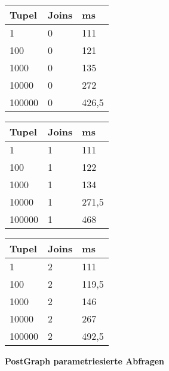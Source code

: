 \begin{table}[H]
\centering
\begin{subtable}[t]{0.3\textwidth}
\centering
\begin{tabular}{|l|l|l|}
\hline
Tupel  & Joins & ms    \\ \hline
1      & 0     & 111   \\ \hline
100    & 0     & 121   \\ \hline
1000   & 0     & 135   \\ \hline
10000  & 0     & 272   \\ \hline
100000 & 0     & 426,5 \\ \hline
\end{tabular}
\end{subtable}%
\hfill
\begin{subtable}[t]{0.3\textwidth}
\centering
\begin{tabular}{|l|l|l|}
\hline
Tupel  & Joins & ms    \\ \hline
1      & 1     & 111   \\ \hline
100    & 1     & 122   \\ \hline
1000   & 1     & 134   \\ \hline
10000  & 1     & 271,5 \\ \hline
100000 & 1     & 468   \\ \hline
\end{tabular}
\end{subtable}%
\hfill
\begin{subtable}[t]{0.3\textwidth}
\centering
\begin{tabular}{|l|l|l|}
\hline
Tupel  & Joins & ms    \\ \hline
1      & 2     & 111   \\ \hline
100    & 2     & 119,5 \\ \hline
1000   & 2     & 146   \\ \hline
10000  & 2     & 267   \\ \hline
100000 & 2     & 492,5 \\ \hline
\end{tabular}
\end{subtable}
\end{table}
\noindent
\textbf{PostGraph parametriesierte Abfragen}

